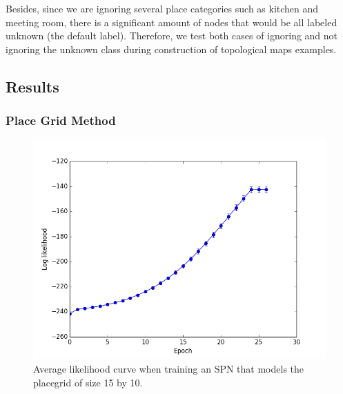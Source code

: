 \documentclass[11pt, titlepage]{article}
\theoremstyle{definition}
\begin{document}
Besides, since we are ignoring several place categories such as kitchen and meeting room, there is a significant amount of nodes that would be all labeled unknown (the default label). Therefore, we test both cases of ignoring and not ignoring the unknown class during construction of topological maps examples.

\subsection{Results}\label{section:results}

\subsubsection{Place Grid Method}

\begin{figure}[!htb]
    \centering
    \captionsetup{width=.6\linewidth}
    \includegraphics[scale=0.3]{images/likelihood.png}
    \caption{Average likelihood curve when training an SPN that models the placegrid of size 15 by 10. }
    \label{fig:topomap}
\end{figure}
\end{document}
